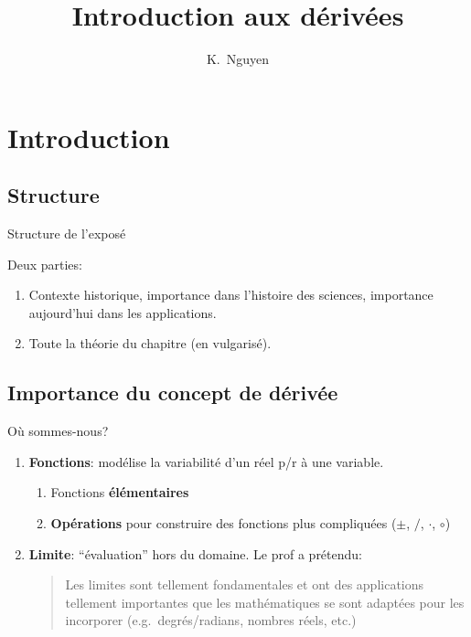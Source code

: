 \documentclass{beamer}
\title{Introduction aux dérivées}
\author{K.~Nguyen}
\begin{document}
\section{Introduction}

\subsection{Structure}

\begin{frame}
    {Structure de l'exposé}

    Deux parties:
    \begin{enumerate}
        \item Contexte historique,
            importance dans l'histoire des sciences,
            importance aujourd'hui dans les applications.
            \pause{}
        \item Toute la théorie du chapitre (en vulgarisé).
    \end{enumerate}
\end{frame}

\subsection{Importance du concept de dérivée}

\begin{frame}
    {Où sommes-nous?}

    \begin{enumerate}
        \item \textbf{Fonctions}: modélise la variabilité d'un réel p/r à une variable. %
            \begin{enumerate}
                \item Fonctions \textbf{élémentaires}
                \item \textbf{Opérations} pour construire des fonctions plus compliquées ($\pm$, $/$, $\cdot$, $\circ$)
            \end{enumerate}
            \pause{}
        \item \textbf{Limite}: ``évaluation'' hors du domaine.
            Le prof a prétendu:
            \begin{quote}
                Les limites sont tellement fondamentales
                et ont des applications tellement importantes
                que les mathématiques se sont adaptées pour les incorporer
                (e.g.\ degrés/radians, nombres réels, etc.)
            \end{quote}
    \end{enumerate}
\end{frame}
\end{document}
